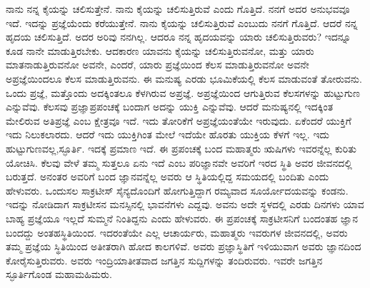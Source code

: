 \vskip 2pt

ನಾನು ನನ್ನ ಕೈಯನ್ನು ಚಲಿಸುತ್ತೇನೆ. ನಾನು ಕೈಯನ್ನು ಚಲಿಸುತ್ತಿರುವೆ ಎಂದು ಗೊತ್ತಿದೆ. ನನಗೆ ಅದರ ಅನುಭವವೂ ಇದೆ. ಇದನ್ನು ಪ್ರಜ್ಞೆಯೆಂದು ಕರೆಯುತ್ತೇನೆ. ನಾನು ಕೈಯನ್ನು ಚಲಿಸುತ್ತಿರುವೆ ಎಂಬುದು ನನಗೆ ಗೊತ್ತಿದೆ. ಆದರೆ ನನ್ನ ಹೃದಯ ಚಲಿಸುತ್ತಿದೆ. ಅದರ ಅರಿವು ನನಗಿಲ್ಲ. ಆದರೂ ನನ್ನ ಹೃದಯವನ್ನು ಯಾರು ಚಲಿಸುತ್ತಿರುವರು? ಇದನ್ನೂ ಕೂಡ ನಾನೇ ಮಾಡುತ್ತಿರಬೇಕು. ಆದಕಾರಣ ಯಾವನು ಕೈಯನ್ನು ಚಲಿಸುತ್ತಿರುವನೋ, ಮತ್ತು ಯಾರು ಮಾತನಾಡುತ್ತಿರುವನೋ ಅವನೇ, ಎಂದರೆ, ಯಾರು ಪ್ರಜ್ಞೆಯಿಂದ ಕೆಲಸ ಮಾಡುತ್ತಿರುವನೋ ಅವನೇ ಅಪ್ರಜ್ಞೆಯಿಂದಲೂ ಕೆಲಸ ಮಾಡುತ್ತಿರುವನು. ಈ ಮನುಷ್ಯ ಎರಡು ಭೂಮಿಕೆಯಲ್ಲಿ ಕೆಲಸ ಮಾಡುವಂತೆ ತೋರುವನು. ಒಂದು ಪ್ರಜ್ಞೆ, ಮತ್ತೊಂದು ಅದಕ್ಕಿಂತಲೂ ಕೆಳಗಿರುವ ಅಪ್ರಜ್ಞೆ. ಅಪ್ರಜ್ಞೆಯಿಂದ ಆಗುತ್ತಿರುವ ಕೆಲಸಗಳನ್ನು ಹುಟ್ಟುಗುಣ ಎನ್ನುವೆವು. ಕೆಲಸವು ಪ್ರಜ್ಞಾಪ್ರಪಂಚಕ್ಕೆ ಬಂದಾಗ ಅದನ್ನು ಯುಕ್ತಿ ಎನ್ನುವೆವು. ಆದರೆ ಮನುಷ್ಯನಲ್ಲಿ ಇದಕ್ಕಿಂತ ಮೇಲಿರುವ ಅತಿಪ್ರಜ್ಞೆ ಎಂಬ ಕ್ಷೇತ್ರವೂ ಇದೆ. ಇದು ತೋರಿಕೆಗೆ ಅಪ್ರಜ್ಞೆಯಂತೆಯೇ ಇರುವುದು. ಏಕೆಂದರೆ ಯುಕ್ತಿಗೆ ಇದು ನಿಲುಕಲಾರದು. ಆದರೆ ಇದು ಯುಕ್ತಿಗಿಂತ ಮೇಲೆ ಇದೆಯೇ ಹೊರತು ಯುಕ್ತಿಯ ಕೆಳಗೆ ಇಲ್ಲ. ಇದು ಹುಟ್ಟುಗುಣವಲ್ಲ,\break ಸ್ಫೂರ್ತಿ. ಇದಕ್ಕೆ ಪ್ರಮಾಣ ಇದೆ. ಈ ಪ್ರಪಂಚಕ್ಕೆ ಬಂದ ಮಹಾತ್ಮರು ಋಷಿಗಳು ಇವರನ್ನೆಲ್ಲ ಕುರಿತು ಯೋಚಿಸಿ. ಕೆಲವು ವೇಳೆ ತಮ್ಮ ಸುತ್ತಲೂ ಏನು ಇದೆ ಎಂಬ ಪರಿಜ್ಞಾನವೇ ಅವರಿಗೆ ಇರದ ಸ್ಥಿತಿ ಅವರ ಜೀವನದಲ್ಲಿ ಬರುತ್ತದೆ. ಅನಂತರ ಅವರಿಗೆ ಬಂದ ಜ್ಞಾನವನ್ನೆಲ್ಲ ಅವರು ಆ ಸ್ಥಿತಿಯಲ್ಲಿದ್ದ ಸಮಯದಲ್ಲಿ ಬಂದಿತು ಎಂದು ಹೇಳುವರು. ಒಂದುಸಲ ಸಾಕ್ರಟೀಸ್ ಸೈನ್ಯದೊಂದಿಗೆ ಹೋಗುತ್ತಿದ್ದಾಗ ರಮ್ಯವಾದ ಸೂರ್ಯೋದಯವನ್ನು ಕಂಡನು. ಇದನ್ನು ನೋಡಿದಾಗ ಸಾಕ್ರಟೀಸನ ಮನಸ್ಸಿನಲ್ಲಿ ಭಾವನೆಗಳು ಎದ್ದವು. ಅವನು ಅದೇ ಸ್ಥಳದಲ್ಲಿ ಎರಡು ದಿನಗಳು ಯಾವ ಬಾಹ್ಯ ಪ್ರಜ್ಞೆಯೂ ಇಲ್ಲದೆ ಸುಮ್ಮನೆ ನಿಂತಿದ್ದನು ಎಂದು ಹೇಳುವರು. ಈ ಪ್ರಪಂಚಕ್ಕೆ ಸಾಕ್ರಟೀಸನಿಗೆ ಬಂದಂತಹ ಜ್ಞಾನ ಬಂದದ್ದು ಅಂತಹ\break ಸ್ಥಿತಿಯಿಂದ. ಇದರಂತೆಯೇ ಎಲ್ಲ ಆಚಾರ್ಯರು, ಮಹಾತ್ಮರು ಇವರುಗಳ ಜೀವನದಲ್ಲಿ, ಅವರು ತಮ್ಮ ಪ್ರಜ್ಞೆಯ ಸ್ಥಿತಿಯಿಂದ ಅತೀತರಾಗಿ ಹೋದ ಕಾಲಗಳಿವೆ. ಅವರು ಪ್ರಜ್ಞಾಸ್ಥಿತಿಗೆ ಇಳಿಯುವಾಗ ಅವರು ಜ್ಞಾನದಿಂದ ಕೋರೈಸುತ್ತಿರುವರು. ಅವರು ಇಂದ್ರಿಯಾತೀತವಾದ ಜಗತ್ತಿನ ಸುದ್ದಿಗಳನ್ನು ತಂದಿರುವರು. ಇವರೇ ಜಗತ್ತಿನ ಸ್ಫೂರ್ತಿಗೊಂಡ ಮಹಾಮಹಿಮರು.

\vskip 2pt

